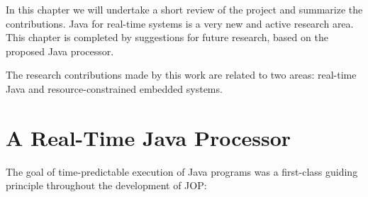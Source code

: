 
In this chapter we will undertake a short review of the project and
summarize the contributions. Java for real-time systems is a very
new and active research area. This chapter is completed by
suggestions for future research, based on the proposed Java
processor.

The research contributions made by this work are related to two
areas: real-time Java and resource-constrained embedded systems.

\section{A Real-Time Java Processor}

The goal of time-predictable execution of Java programs was a
first-class guiding principle throughout the development of JOP:

